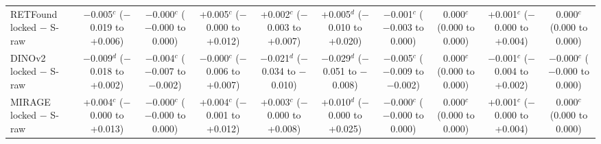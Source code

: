 \begin{tabular}{@{}lccccccccc@{}}
RETFound locked $-$ S-raw & \makecell{$-$0.005$^{c}$\\{\scriptsize ($-$0.019 to +0.006)}} & \makecell{$-$0.000$^{c}$\\{\scriptsize ($-$0.000 to 0.000)}} & \makecell{+0.005$^{c}$\\{\scriptsize ($-$0.000 to +0.012)}} & \makecell{+0.002$^{c}$\\{\scriptsize ($-$0.003 to +0.007)}} & \makecell{+0.005$^{d}$\\{\scriptsize ($-$0.010 to +0.020)}} & \makecell{$-$0.001$^{c}$\\{\scriptsize ($-$0.003 to 0.000)}} & \makecell{0.000$^{c}$\\{\scriptsize (0.000 to 0.000)}} & \makecell{+0.001$^{c}$\\{\scriptsize ($-$0.000 to +0.004)}} & \makecell{0.000$^{c}$\\{\scriptsize (0.000 to 0.000)}} \\
DINOv2 locked $-$ S-raw & \makecell{$-$0.009$^{d}$\\{\scriptsize ($-$0.018 to +0.002)}} & \makecell{$-$0.004$^{c}$\\{\scriptsize ($-$0.007 to $-$0.002)}} & \makecell{$-$0.000$^{c}$\\{\scriptsize ($-$0.006 to +0.007)}} & \makecell{$-$0.021$^{d}$\\{\scriptsize ($-$0.034 to $-$0.010)}} & \makecell{$-$0.029$^{d}$\\{\scriptsize ($-$0.051 to $-$0.008)}} & \makecell{$-$0.005$^{c}$\\{\scriptsize ($-$0.009 to $-$0.002)}} & \makecell{0.000$^{c}$\\{\scriptsize (0.000 to 0.000)}} & \makecell{$-$0.001$^{c}$\\{\scriptsize ($-$0.004 to +0.002)}} & \makecell{$-$0.000$^{c}$\\{\scriptsize ($-$0.000 to 0.000)}} \\
MIRAGE locked $-$ S-raw & \makecell{+0.004$^{c}$\\{\scriptsize ($-$0.000 to +0.013)}} & \makecell{$-$0.000$^{c}$\\{\scriptsize ($-$0.000 to 0.000)}} & \makecell{+0.004$^{c}$\\{\scriptsize ($-$0.001 to +0.012)}} & \makecell{+0.003$^{c}$\\{\scriptsize ($-$0.000 to +0.008)}} & \makecell{+0.010$^{d}$\\{\scriptsize ($-$0.000 to +0.025)}} & \makecell{$-$0.000$^{c}$\\{\scriptsize ($-$0.000 to 0.000)}} & \makecell{0.000$^{c}$\\{\scriptsize (0.000 to 0.000)}} & \makecell{+0.001$^{c}$\\{\scriptsize ($-$0.000 to +0.004)}} & \makecell{0.000$^{c}$\\{\scriptsize (0.000 to 0.000)}} \\

\end{tabular}
